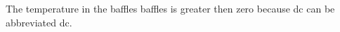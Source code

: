 \documentclass{article}
\begin{document}
The temperature in  the \gls{baffles} baffles is greater then \gls{zero} because
\acrlong{dc} can be abbreviated \acrshort{dc}.

\printglossary[type=\acronymtype]
\printglossary
\end{document}
